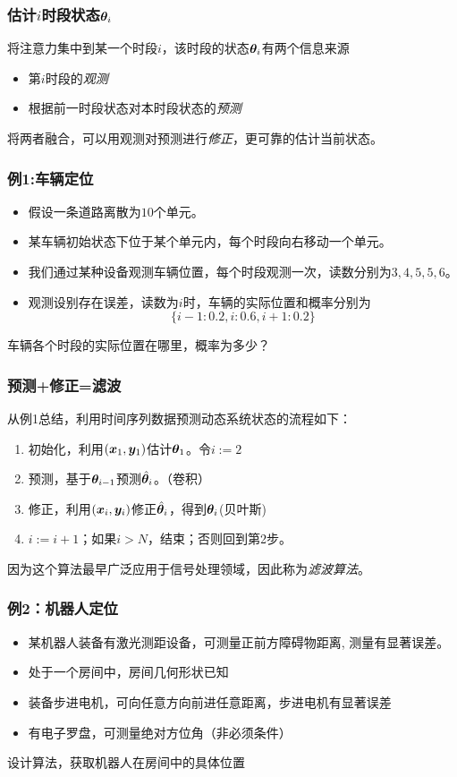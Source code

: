 \documentclass[14pt]{beamer}
\begin{document}
\begin{frame}
  \frametitle{估计$i$时段状态$\bm{\theta}_i$}
  将注意力集中到某一个时段$i$，该时段的状态$\bm{\theta}_i$有两个信息来源
  \begin{itemize}
    \item 第$i$时段的\emph{观测}
    \item 根据前一时段状态对本时段状态的\emph{预测}
  \end{itemize}
  将两者融合，可以用观测对预测进行\emph{修正}，更可靠的估计当前状态。
\end{frame}

\begin{frame}
  \frametitle{例1:车辆定位}
  \begin{itemize}
    \item 假设一条道路离散为$10$个单元。
    \item 某车辆初始状态下位于某个单元内，每个时段向右移动一个单元。
    \item 我们通过某种设备观测车辆位置，每个时段观测一次，读数分别为${3,4,5,5,6}$。
    \item 观测设别存在误差，读数为$i$时，车辆的实际位置和概率分别为
    $$\{i-1:0.2,i:0.6,i+1:0.2\}$$
  \end{itemize}

  车辆各个时段的实际位置在哪里，概率为多少？
\end{frame}

\begin{frame}
  \frametitle{预测+修正=滤波}
  从例1总结，利用时间序列数据预测动态系统状态的流程如下：
  \begin{enumerate}
    \item 初始化，利用$(\bm{x}_1,\bm{y}_1)$估计$\bm{\theta}_1$。令$i:=2$
    \item 预测，基于$\bm{\theta}_{i-1}$预测$\hat{\bm{\theta}}_i$。（卷积）
    \item 修正，利用$(\bm{x}_i,\bm{y}_i)$修正$\hat{\bm{\theta}}_i$，得到$\bm{\theta}_i$(贝叶斯)
    \item $i:=i+1$；如果$i>N$，结束；否则回到第2步。
  \end{enumerate}

  因为这个算法最早广泛应用于信号处理领域，因此称为\emph{滤波算法}。
\end{frame}

\begin{frame}
  \frametitle{例2：机器人定位}
  \begin{itemize}
    \item 某机器人装备有激光测距设备，可测量正前方障碍物距离, 测量有显著误差。
    \item 处于一个房间中，房间几何形状已知
    \item 装备步进电机，可向任意方向前进任意距离，步进电机有显著误差
    \item 有电子罗盘，可测量绝对方位角（非必须条件）
  \end{itemize}
  设计算法，获取机器人在房间中的具体位置
\end{frame}
\end{document}
